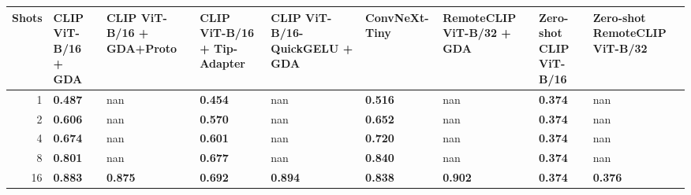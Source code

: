 \begin{tabular}{rllllllll}
\toprule
Shots & CLIP ViT-B/16 + GDA & CLIP ViT-B/16 + GDA+Proto & CLIP ViT-B/16 + Tip-Adapter & CLIP ViT-B/16-QuickGELU + GDA & ConvNeXt-Tiny & RemoteCLIP ViT-B/32 + GDA & Zero-shot CLIP ViT-B/16 & Zero-shot RemoteCLIP ViT-B/32 \\
\midrule
1 & \textbf{0.487} & nan & \textbf{0.454} & nan & \textbf{0.516} & nan & \textbf{0.374} & nan \\
2 & \textbf{0.606} & nan & \textbf{0.570} & nan & \textbf{0.652} & nan & \textbf{0.374} & nan \\
4 & \textbf{0.674} & nan & \textbf{0.601} & nan & \textbf{0.720} & nan & \textbf{0.374} & nan \\
8 & \textbf{0.801} & nan & \textbf{0.677} & nan & \textbf{0.840} & nan & \textbf{0.374} & nan \\
16 & \textbf{0.883} & \textbf{0.875} & \textbf{0.692} & \textbf{0.894} & \textbf{0.838} & \textbf{0.902} & \textbf{0.374} & \textbf{0.376} \\
\bottomrule
\end{tabular}
